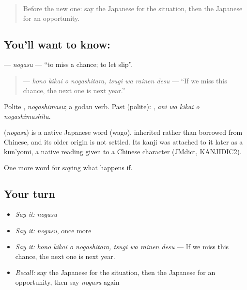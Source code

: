 \begin{quote}
Before the new one: say the Japanese for the situation, then the Japanese for an opportunity.
\end{quote}

\subsection*{You'll want to know: }
\textbf{} — \emph{nogasu} — \textquotedblleft{}to miss a chance; to let slip\textquotedblright{}.

\begin{quote}
\textbf{   } — \emph{kono kikai o nogashitara, tsugi wa rainen desu} — \textquotedblleft{}If we miss this chance, the next one is next year.\textquotedblright{}
\end{quote}

Polite \textbf{}, \emph{nogashimasu}; a godan verb. Past (polite): \textbf{  }, \emph{ani wa kikai o nogashimashita}.

\begin{cousinweb}
\textbf{} (\emph{nogasu}) is a native Japanese word (wago), inherited rather than borrowed from Chinese, and its older origin is not settled. Its kanji was attached to it later as a kun'yomi, a native reading given to a Chinese character (JMdict, KANJIDIC2).
\end{cousinweb}

\begin{grammarlens}[title={What you've built}]
One more word for saying what happens if.
\end{grammarlens}

\subsection*{Your turn}
\begin{itemize}
\raggedright
  \item \emph{Say it:} \emph{nogasu}
  \item \emph{Say it:} \emph{nogasu}, once more
  \item \emph{Say it:} \emph{kono kikai o nogashitara, tsugi wa rainen desu} — If we miss this chance, the next one is next year.
  \item \emph{Recall:} say the Japanese for the situation, then the Japanese for an opportunity, then say \emph{nogasu} again
\end{itemize}

